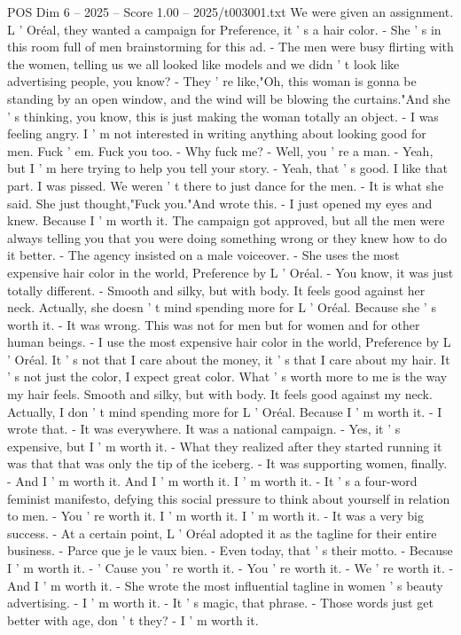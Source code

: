\begin{textsample}{POS Dim 6 – 2025 – Score 1.00 – 2025/t003001.txt}
We were given an assignment.
L ' Oréal, they wanted a campaign for Preference, it ' s a hair color. - She ' s in this room full of men brainstorming for this ad. - The men were busy flirting with the women, telling us we all looked like models and we didn ' t look like advertising people, you know? - They ' re like,"Oh, this woman is gonna be standing by an open window, and the wind will be blowing the curtains."And she ' s thinking, you know, this is just making the woman totally an object. - I was feeling angry.
I ' m not interested in writing anything about looking good for men.
Fuck ' em.
Fuck you too. - Why fuck me? - Well, you ' re a man. - Yeah, but I ' m here trying to help you tell your story. - Yeah, that ' s good.
I like that part.
I was pissed.
We weren ' t there to just dance for the men. - It is what she said.
She just thought,"Fuck you."And wrote this. - I just opened my eyes and knew.
Because I ' m worth it.
The campaign got approved, but all the men were always telling you that you were doing something wrong or they knew how to do it better. - The agency insisted on a male voiceover. - She uses the most expensive hair color in the world, Preference by L ' Oréal. - You know, it was just totally different. - Smooth and silky, but with body.
It feels good against her neck.
Actually, she doesn ' t mind spending more for L ' Oréal.
Because she ' s worth it. - It was wrong.
This was not for men but for women and for other human beings. - I use the most expensive hair color in the world, Preference by L ' Oréal.
It ' s not that I care about the money, it ' s that I care about my hair.
It ' s not just the color, I expect great color.
What ' s worth more to me is the way my hair feels.
Smooth and silky, but with body.
It feels good against my neck.
Actually, I don ' t mind spending more for L ' Oréal.
Because I ' m worth it. - I wrote that. - It was everywhere.
It was a national campaign. - Yes, it ' s expensive, but I ' m worth it. - What they realized after they started running it was that that was only the tip of the iceberg. - It was supporting women, finally. - And I ' m worth it.
And I ' m worth it.
I ' m worth it. - It ' s a four-word feminist manifesto, defying this social pressure to think about yourself in relation to men. - You ' re worth it.
I ' m worth it.
I ' m worth it. - It was a very big success. - At a certain point, L ' Oréal adopted it as the tagline for their entire business. - Parce que je le vaux bien. - Even today, that ' s their motto. - Because I ' m worth it. - ' Cause you ' re worth it. - You ' re worth it. - We ' re worth it. - And I ' m worth it. - She wrote the most influential tagline in women ' s beauty advertising. - I ' m worth it. - It ' s magic, that phrase. - Those words just get better with age, don ' t they? - I ' m worth it.

\end{textsample}
